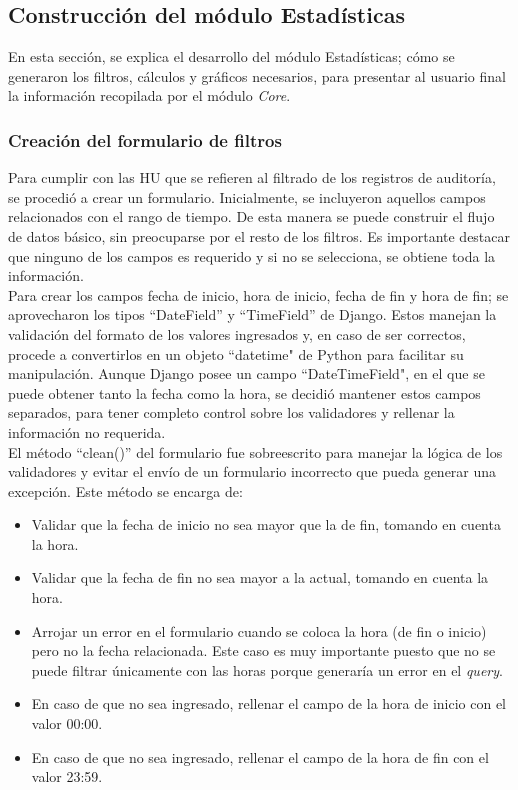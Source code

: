 \subsection{Construcción del módulo Estadísticas}

En esta sección, se explica el desarrollo del módulo Estadísticas; cómo se generaron los filtros, cálculos y gráficos necesarios, para presentar al usuario final la información recopilada por el módulo \textit{Core}.

\subsubsection{Creación del formulario de filtros}

Para cumplir con las HU que se refieren al filtrado de los registros de auditoría, se procedió a crear un formulario. Inicialmente, se incluyeron aquellos campos relacionados con el rango de tiempo. De esta manera se puede construir el flujo de datos básico, sin preocuparse por el resto de los filtros. Es importante destacar que ninguno de los campos es requerido y si no se selecciona, se obtiene toda la información.\\

Para crear los campos fecha de inicio, hora de inicio, fecha de fin y hora de fin; se aprovecharon los tipos “DateField” y “TimeField” de Django. Estos manejan la validación del formato de los valores ingresados y, en caso de ser correctos, procede a convertirlos en un objeto “datetime" de Python para facilitar su manipulación. Aunque Django posee un campo “DateTimeField", en el que se puede obtener tanto la fecha como la hora, se decidió mantener estos campos separados, para tener completo control sobre los validadores y rellenar la información no requerida. \\

El método “clean()” del formulario fue sobreescrito para manejar la lógica de los validadores y evitar el envío de un formulario incorrecto que pueda generar una excepción. Este método se encarga de:

\begin{itemize}
    \item Validar que la fecha de inicio no sea mayor que la de fin, tomando en cuenta la hora.
    \item Validar que la fecha de fin no sea mayor a la actual, tomando en cuenta la hora.
    \item Arrojar un error en el formulario cuando se coloca la hora (de fin o inicio) pero no la fecha relacionada. Este caso es muy importante puesto que no se puede filtrar únicamente con las horas porque generaría un error en el \textit{query}.
    \item En caso de que no sea ingresado, rellenar el campo de la hora de inicio con el valor 00:00.
    \item En caso de que no sea ingresado, rellenar el campo de la hora de fin con el valor 23:59.
\end{itemize}



